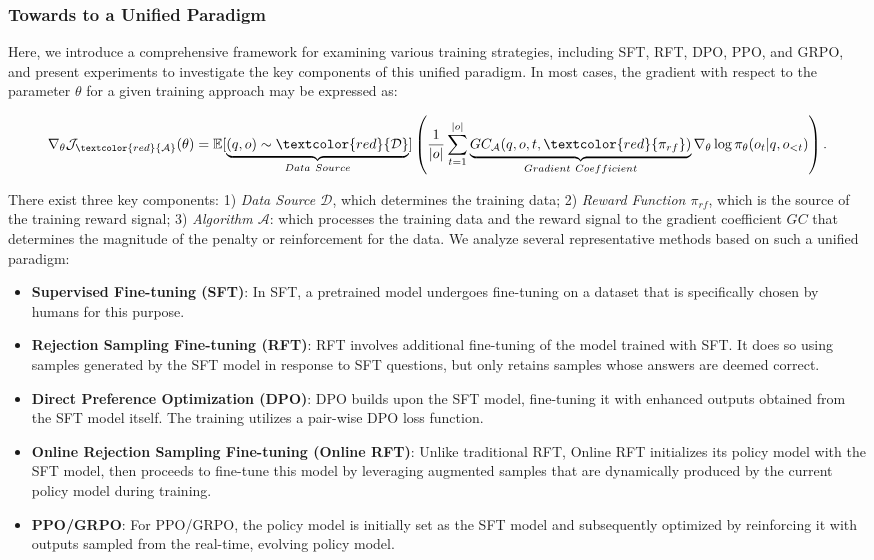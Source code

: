 \begin{itemize}[topsep=0pt]
\begin{itemize}[topsep=0pt]
\subsubsection{Towards to a Unified Paradigm} Here, we introduce a comprehensive framework for examining various training strategies, including SFT, RFT, DPO, PPO, and GRPO, and present experiments to investigate the key components of this unified paradigm. In most cases, the gradient with respect to the parameter $\theta$ for a given training approach may be expressed as:

\begin{equation}
    \nabla_{\theta}\mathcal{J}_{\textcolor{red}{\mathcal{A}}}(\theta) = \mathbb{E}[\underbrace{(q,o) \sim \textcolor{red}{\mathcal{D}}}_{Data \ Source}]\left( \frac{1}{|o|} \sum_{t=1}^{|o|}  \underbrace{GC_{{\mathcal{A}}}(q, o, t, \textcolor{red}{\pi_{{rf}}})}_{Gradient \ Coefficient}  \nabla_{\theta}\log \pi_{\theta}(o_t | q, o_{<t})\right).
\label{eq:objective}
\end{equation}

There exist three key components: 1) \textit{Data Source $\mathcal{D}$}, which determines the training data; 2) \textit{Reward Function $\pi_{{rf}}$}, which is the source of the training reward signal; 3) \textit{Algorithm $\mathcal{A}$}: which processes the training data and the reward signal to the gradient coefficient $GC$ that determines the magnitude of the penalty or reinforcement for the data. We analyze several representative methods based on such a unified paradigm:

\begin{itemize}
    \item  \textbf{Supervised Fine-tuning (SFT)}: In SFT, a pretrained model undergoes fine-tuning on a dataset that is specifically chosen by humans for this purpose.
    \item \textbf{Rejection Sampling Fine-tuning (RFT)}: RFT involves additional fine-tuning of the model trained with SFT. It does so using samples generated by the SFT model in response to SFT questions, but only retains samples whose answers are deemed correct.
    \item \textbf{Direct Preference Optimization (DPO)}: DPO builds upon the SFT model, fine-tuning it with enhanced outputs obtained from the SFT model itself. The training utilizes a pair-wise DPO loss function.
    \item \textbf{Online Rejection Sampling Fine-tuning (Online RFT)}: Unlike traditional RFT, Online RFT initializes its policy model with the SFT model, then proceeds to fine-tune this model by leveraging augmented samples that are dynamically produced by the current policy model during training.
    \item \textbf{PPO/GRPO}: For PPO/GRPO, the policy model is initially set as the SFT model and subsequently optimized by reinforcing it with outputs sampled from the real-time, evolving policy model.
\end{itemize}


\end{itemize}
\end{itemize}
